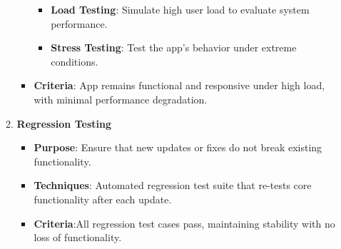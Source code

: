 \documentclass[12pt, titlepage]{article}
\begin{document}
\begin{enumerate}
\begin{enumerate}
\begin{itemize}
			\begin{itemize}
				\item \textbf{Load Testing}: Simulate high user load to evaluate system performance.
				\item \textbf{Stress Testing}: Test the app's behavior under extreme conditions.
			\end{itemize}
			\item \textbf{Criteria}: App remains functional and responsive under high load, with minimal performance degradation.
		\end{itemize}
		\item \textbf{Regression Testing}
		\begin{itemize}
			\item \textbf{Purpose}: Ensure that new updates or fixes do not break existing functionality.
			\item \textbf{Techniques}: Automated regression test suite that re-tests core functionality after each update.
			\item \textbf{Criteria}:All regression test cases pass, maintaining stability with no loss of functionality.
		\end{itemize}
	\end{enumerate}


\end{enumerate}
\end{document}
